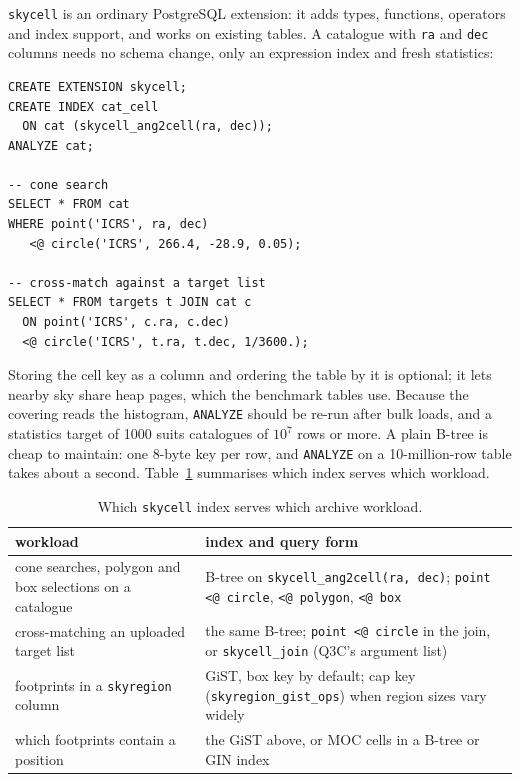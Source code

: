 \texttt{skycell} is an ordinary PostgreSQL extension: it adds types, functions,
operators and index support, and works on existing tables. A catalogue with
\texttt{ra} and \texttt{dec} columns needs no schema change, only an expression index
and fresh statistics:
{\footnotesize
\begin{verbatim}
CREATE EXTENSION skycell;
CREATE INDEX cat_cell
  ON cat (skycell_ang2cell(ra, dec));
ANALYZE cat;

-- cone search
SELECT * FROM cat
WHERE point('ICRS', ra, dec)
   <@ circle('ICRS', 266.4, -28.9, 0.05);

-- cross-match against a target list
SELECT * FROM targets t JOIN cat c
  ON point('ICRS', c.ra, c.dec)
  <@ circle('ICRS', t.ra, t.dec, 1/3600.);
\end{verbatim}}
\noindent Storing the cell key as a column and ordering the table by it is optional; it lets
nearby sky share heap pages, which the benchmark tables use. Because the covering reads
the histogram, \texttt{ANALYZE} should be re-run after bulk loads, and a statistics
target of 1000 suits catalogues of $10^7$ rows or more. A plain B-tree is cheap to
maintain: one 8-byte key per row, and \texttt{ANALYZE} on a 10-million-row table takes
about a second. Table~\ref{tab:workloads} summarises which index serves which workload.

\begin{table}
  \caption{Which \texttt{skycell} index serves which archive workload.}
  \label{tab:workloads}
  \centering
  \footnotesize
  \begin{tabular}{@{}p{} p{}@{}}
    \hline\hline
    workload & index and query form \\
    \hline
    cone searches, polygon and box selections on a catalogue &
      B-tree on \texttt{skycell\_ang2cell(ra, dec)}; \texttt{point <@ circle},
      \texttt{<@ polygon}, \texttt{<@ box} \\[2pt]
    cross-matching an uploaded target list &
      the same B-tree; \texttt{point <@ circle} in the join, or
      \texttt{skycell\_join} (Q3C's argument list) \\[2pt]
    footprints in a \texttt{skyregion} column &
      GiST, box key by default; cap key (\texttt{skyregion\_gist\_ops}) when region
      sizes vary widely \\[2pt]
    which footprints contain a position &
      the GiST above, or MOC cells in a B-tree or GIN index \\
    \hline
  \end{tabular}
\end{table}

